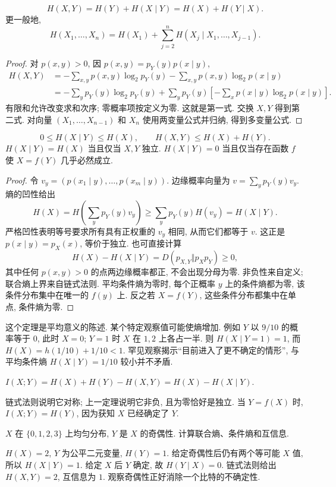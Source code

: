 \begin{theorem}[熵的链式法则]
\[
 H(X,Y)=H(Y)+H(X\mid Y)=H(X)+H(Y\mid X).
\]
更一般地,
\[
 H(X_1,\ldots,X_n)=H(X_1)+\sum_{j=2}^nH(X_j\mid X_1,\ldots,X_{j-1}).
\]
\end{theorem}
\begin{proof}
对 $p(x,y)>0$, 因 $p(x,y)=p_Y(y)p(x\mid y)$,
\begin{align*}
 H(X,Y)&=-\sum_{x,y}p(x,y)\log_2p_Y(y)
         -\sum_{x,y}p(x,y)\log_2p(x\mid y)\\
 &=-\sum_yp_Y(y)\log_2p_Y(y)
   +\sum_yp_Y(y)\left[-\sum_xp(x\mid y)\log_2p(x\mid y)\right].
\end{align*}
有限和允许改变求和次序; 零概率项按定义为零. 这就是第一式. 交换 $X,Y$ 得到第二式. 对向量 $(X_1,\ldots,X_{n-1})$ 和 $X_n$ 使用两变量公式并归纳, 得到多变量公式.
\end{proof}

\begin{theorem}[条件化减少平均熵]
\[
 0\leq H(X\mid Y)\leq H(X),\qquad H(X,Y)\leq H(X)+H(Y).
\]
$H(X\mid Y)=H(X)$ 当且仅当 $X,Y$ 独立. $H(X\mid Y)=0$ 当且仅当存在函数 $f$ 使 $X=f(Y)$ 几乎必然成立.
\end{theorem}
\begin{proof}
令 $v_y=(p(x_1\mid y),\ldots,p(x_m\mid y))$. 边缘概率向量为
$v=\sum_y p_Y(y)v_y$. 熵的凹性给出
\[
 H(X)=H\left(\sum_yp_Y(y)v_y\right)
 \geq\sum_yp_Y(y)H(v_y)=H(X\mid Y).
\]
严格凹性表明等号要求所有具有正权重的 $v_y$ 相同, 从而它们都等于 $v$. 这正是 $p(x\mid y)=p_X(x)$, 等价于独立. 也可直接计算
\[
 H(X)-H(X\mid Y)=D(p_{X,Y}\Vert p_Xp_Y)\geq0,
\]
其中任何 $p(x,y)>0$ 的点两边缘概率都正, 不会出现分母为零.
非负性来自定义; 联合熵上界来自链式法则. 平均条件熵为零时, 每个正概率 $y$ 上的条件熵都为零, 该条件分布集中在唯一的 $f(y)$ 上. 反之若 $X=f(Y)$, 这些条件分布都集中在单点, 条件熵为零.
\end{proof}
这个定理是平均意义的陈述. 某个特定观察值可能使熵增加. 例如 $Y$ 以 $9/10$ 的概率等于 $0$, 此时 $X=0$; $Y=1$ 时 $X$ 在 $1,2$ 上各占一半. 则 $H(X\mid Y=1)=1$, 而 $H(X)=h(1/10)+1/10<1$. 罕见观察揭示“目前进入了更不确定的情形”, 与平均条件熵 $H(X\mid Y)=1/10$ 较小并不矛盾.

\begin{definition}[互信息]
$ I(X;Y)=H(X)+H(Y)-H(X,Y)=H(X)-H(X\mid Y)$.
\end{definition}
链式法则说明它对称; 上一定理说明它非负, 且为零恰好是独立. 当 $Y=f(X)$ 时, $I(X;Y)=H(Y)$, 因为获知 $X$ 已经确定了 $Y$.

\begin{example}
$X$ 在 $\{0,1,2,3\}$ 上均匀分布, $Y$ 是 $X$ 的奇偶性. 计算联合熵、条件熵和互信息.
\end{example}
\begin{solution}
$H(X)=2$, $Y$ 为公平二元变量, $H(Y)=1$. 给定奇偶性后仍有两个等可能 $X$ 值, 所以 $H(X\mid Y)=1$. 给定 $X$ 后 $Y$ 确定, 故 $H(Y\mid X)=0$. 链式法则给出 $H(X,Y)=2$, 互信息为 $1$. 观察奇偶性正好消除一个比特的不确定性.
\end{solution}

